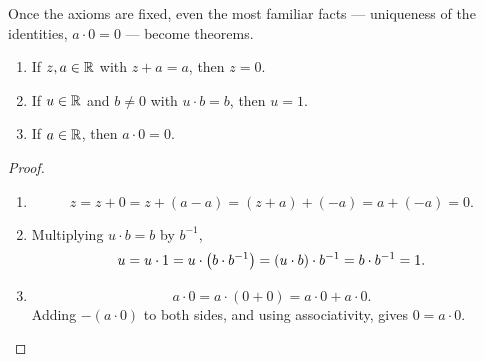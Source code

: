 Once the axioms are fixed, even the most familiar facts --- uniqueness of the identities, $a\cdot0=0$ --- become theorems.


\begin{theorem}\label{thm:field-facts}
    \leavevmode
    \begin{enumerate}[label = \alph*)]
        \item If $z, a \in \mathbb{R}$ with $z + a = a$, then $z = 0$.
        \item If $u \in \mathbb{R}$ and $b \neq 0$ with $u \cdot b = b$, then $u = 1$.
        \item If $a \in \mathbb{R}$, then $a \cdot 0 = 0$.
    \end{enumerate}
\end{theorem}

\begin{proof}
    \begin{enumerate}[label = \alph*)]
        \item
        \[
            z = z + 0 = z + (a - a) = (z + a) + (-a) = a + (-a) = 0.
        \]
        \item Multiplying $u \cdot b = b$ by $b^{-1}$,
        \[
            u = u \cdot 1 = u \cdot \left(b \cdot b^{-1}\right) = (u \cdot b) \cdot b^{-1} = b \cdot b^{-1} = 1.
        \]
        \item
        \[
            a\cdot0=a\cdot(0+0)=a\cdot0+a\cdot0.
        \]
        Adding $-(a\cdot0)$ to both sides, and using associativity, gives
        $0=a\cdot0$.
    \end{enumerate}
\end{proof}

